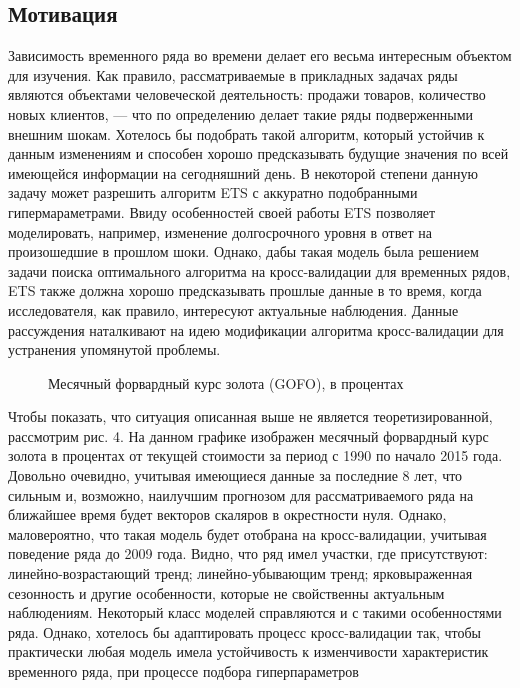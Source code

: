 \documentclass[a4paper, 14pt]{article}
\begin{document}
\subsection{Мотивация}

Зависимость временного ряда во времени делает его весьма интересным объектом для изучения. Как правило, рассматриваемые в прикладных задачах ряды являются объектами человеческой деятельность: продажи товаров, количество новых клиентов, --- что по определению делает такие ряды подверженными внешним шокам. Хотелось бы подобрать такой алгоритм, который устойчив к данным изменениям и способен хорошо предсказывать будущие значения по всей имеющейся информации на сегодняшний день. В некоторой степени данную задачу может разрешить алгоритм ETS с аккуратно подобранными гипермараметрами. Ввиду особенностей своей работы ETS позволяет моделировать, например, изменение долгосрочного уровня в ответ на произошедшие в прошлом шоки. Однако, дабы такая модель была решением задачи поиска оптимального алгоритма на кросс-валидации для временных рядов, ETS также должна хорошо предсказывать прошлые данные в то время, когда исследователя, как правило, интересуют актуальные наблюдения. Данные рассуждения наталкивают на идею модификации алгоритма кросс-валидации для устранения упомянутой проблемы.

\begin{figure}[h]\label{ris: gofo}
	\caption{Месячный форвардный курс золота (GOFO), в процентах \cite{quandlGOFO}}
\end{figure}

Чтобы показать, что ситуация описанная выше не является теоретизированной,  рассмотрим рис. 4. %
На данном графике изображен месячный форвардный курс золота в процентах от текущей стоимости за период с 1990 по начало 2015 года. Довольно очевидно, учитывая имеющиеся данные за последние 8 лет, что сильным и, возможно, наилучшим прогнозом для рассматриваемого ряда на ближайшее время будет векторов скаляров в окрестности нуля. Однако, маловероятно, что такая модель будет отобрана на кросс-валидации, учитывая поведение ряда до 2009 года. Видно, что ряд имел участки, где присутствуют: линейно-возрастающий тренд; линейно-убывающим тренд; ярковыраженная сезонность и другие особенности, которые не свойственны актуальным наблюдениям. Некоторый класс моделей справляются и с такими особенностями ряда. Однако, хотелось бы адаптировать процесс кросс-валидации так, чтобы практически любая модель имела устойчивость к изменчивости характеристик временного ряда, при процессе подбора гиперпараметров 
\end{document}
